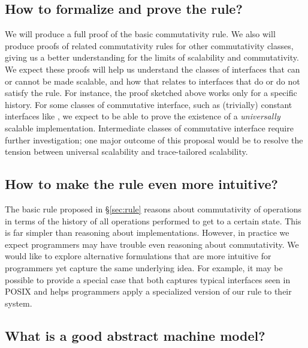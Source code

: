 \subsection{How to formalize and prove the rule?}

We will produce a full proof of the basic commutativity rule.
%
We also will produce proofs of related commutativity rules for other
commutativity classes, giving us a better understanding for the
limits of scalability and commutativity.  We expect these proofs
will help us understand the classes of interfaces that can or cannot
be made scalable, and how that relates to interfaces that do or do not
satisfy the rule.
%
For instance, the proof sketched above works only for a specific history.
%
For some classes of commutative interface, such as (trivially)
constant interfaces like , we expect to be able to
prove the existence of a \emph{universally} scalable implementation.
%
Intermediate classes of commutative interface require further
investigation; one major outcome of this proposal would be to resolve
the tension between universal scalability and trace-tailored scalability.


\subsection{How to make the rule even more intuitive?}

The basic rule proposed in \S\ref{sec:rule} reasons about commutativity
of operations in terms of the history of all operations performed to
get to a certain state.  This is far simpler than reasoning about
implementations.
%
However, in practice we expect programmers may
have trouble even reasoning about commutativity.
We would like to explore alternative
formulations that are more intuitive for programmers yet capture the
same underlying idea.  For example, it may be possible to provide
a special case that both captures typical interfaces seen in POSIX and
helps programmers apply a specialized version of our rule to their
system.


\subsection{What is a good abstract machine model?}


